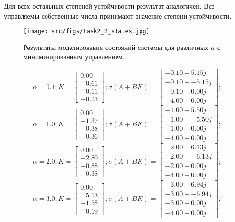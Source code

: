 Для всех остальных степеней устойчивости результат аналогичен. Все управляемы собственные числа принимают значение степени устойчивости.
\begin{figure}[ht!]
    \centering
    \texttt{[image: src/figs/task2\_2\_states.jpg]}
    \caption{Результаты моделирования состояний системы для различных \(\alpha\) с минимизированным управлением.}
    \label{fig:task2_2_states}
\end{figure}

\[
\alpha = 0.1; 
K = \begin{bmatrix}
  0.00\\
 -0.61\\
 -0.11\\
 -0.23
\end{bmatrix};
\sigma(A+BK) = \begin{bmatrix}
 -0.10 + 5.15j\\
 -0.10 + -5.15j\\
 -0.10 + 0.00j\\
 -4.00 + 0.00j
\end{bmatrix};
\]
\[
\alpha = 1.0; 
K = \begin{bmatrix}
  0.00\\
 -1.37\\
 -0.38\\
 -0.36
\end{bmatrix};
\sigma(A+BK) = \begin{bmatrix}
 -1.00 + 5.50j\\
 -1.00 + -5.50j\\
 -1.00 + 0.00j\\
 -4.00 + 0.00j
\end{bmatrix};
\]
\[
\alpha = 2.0; 
K = \begin{bmatrix}
  0.00\\
 -2.80\\
 -0.88\\
 -0.38
\end{bmatrix};
\sigma(A+BK) = \begin{bmatrix}
 -2.00 + 6.13j\\
 -2.00 + -6.13j\\
 -2.00 + 0.00j\\
 -4.00 + 0.00j
\end{bmatrix};
\]
\[
\alpha = 3.0; 
K = \begin{bmatrix}
  0.00\\
 -5.13\\
 -1.58\\
 -0.19
\end{bmatrix};
\sigma(A+BK) = \begin{bmatrix}
 -3.00 + 6.94j\\
 -3.00 + -6.94j\\
 -3.00 + 0.00j\\
 -4.00 + 0.00j
\end{bmatrix};
\]



\FloatBarrier